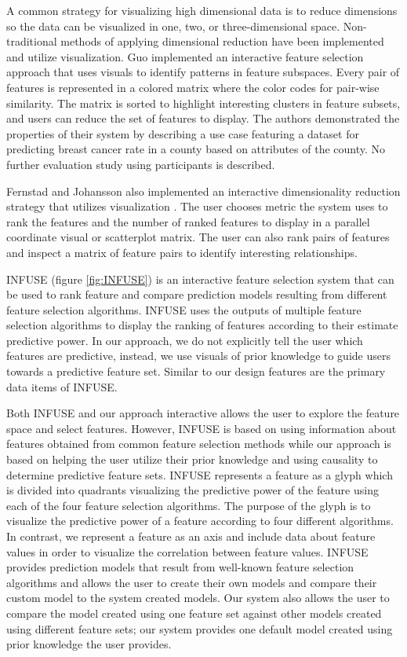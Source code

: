 \indent A common strategy for visualizing high dimensional data is to reduce dimensions so the data can be visualized in one, two, or three-dimensional space. Non-traditional methods of applying dimensional reduction have been implemented and utilize visualization. Guo \cite{Guo} implemented an interactive feature selection approach that uses visuals to identify patterns in feature subspaces. Every pair of features is represented in a colored matrix where the color codes for pair-wise similarity. The matrix is sorted to highlight interesting clusters in feature subsets, and users can reduce the set of features to display. The authors demonstrated the properties of their system by describing a use case featuring a dataset for predicting breast cancer rate in a county based on attributes of the county. No further evaluation study using participants is described.  

Fernstad and Johansson also implemented an interactive dimensionality reduction strategy that utilizes visualization \cite{InteractiveDR}. The user chooses metric the system uses to rank the features and the number of ranked features to display in a parallel coordinate visual or scatterplot matrix. The user can also rank pairs of features and inspect a matrix of feature pairs to identify interesting relationships.

INFUSE \cite{INFUSE} (figure \ref{fig:INFUSE}) is an interactive feature selection system that can be used to rank feature and compare prediction models resulting from different feature selection algorithms. INFUSE uses the outputs of multiple feature selection algorithms to display the ranking of features according to their estimate predictive power. In our approach, we do not explicitly tell the user which features are predictive, instead, we use visuals of prior knowledge to guide users towards a predictive feature set. Similar to our design features are the primary data items of INFUSE. 

Both INFUSE and our approach interactive allows the user to explore the feature space and select features. However, INFUSE is based on using information about features obtained from common feature selection methods while our approach is based on helping the user utilize their prior knowledge and using causality to determine predictive feature sets. INFUSE represents a feature as a glyph which is divided into quadrants visualizing the predictive power of the feature using each of the four feature selection algorithms. The purpose of the glyph is to visualize the predictive power of a feature according to four different algorithms. In contrast, we represent a feature as an axis and include data about feature values in order to visualize the correlation between feature values. INFUSE provides prediction models that result from well-known feature selection algorithms and allows the user to create their own models and compare their custom model to the system created models. Our system also allows the user to compare the model created using one feature set against other models created using different feature sets; our system provides one default model created using prior knowledge the user provides.

